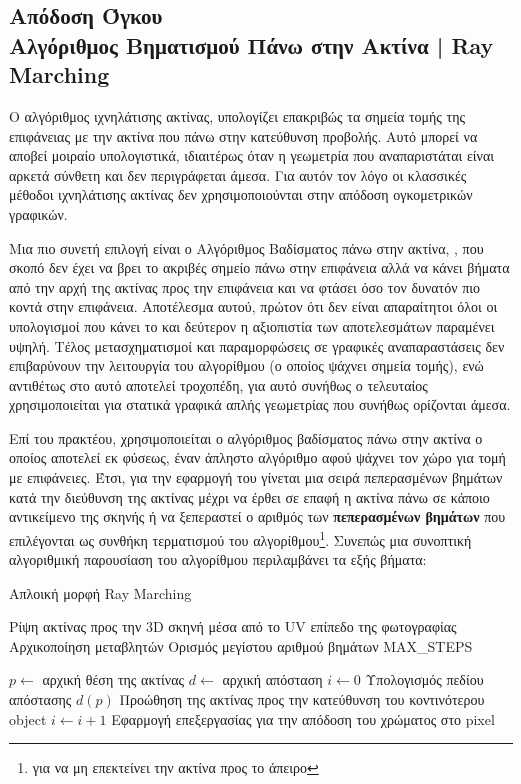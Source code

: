 \subsection{Απόδοση Όγκου \\ \large {Αλγόριθμος Βηματισμού Πάνω στην Ακτίνα | Ray Marching} }
\par
    O αλγόριθμος ιχνηλάτισης ακτίνας, υπολογίζει επακριβώς τα σημεία τομής της επιφάνειας με την ακτίνα που πάνω στην κατεύθυνση προβολής. Αυτό μπορεί να αποβεί μοιραίο υπολογιστικά, ιδιαιτέρως όταν η γεωμετρία που αναπαριστάται είναι αρκετά σύνθετη και δεν περιγράφεται άμεσα. Για αυτόν τον λόγο οι κλασσικές μέθοδοι ιχνηλάτισης ακτίνας δεν χρησιμοποιούνται στην απόδοση ογκομετρικών γραφικών. 
\par
    Μια πιο συνετή επιλογή είναι ο Αλγόριθμος Βαδίσματος πάνω στην ακτίνα, , που σκοπό δεν έχει να βρει το ακριβές σημείο πάνω στην επιφάνεια αλλά να κάνει βήματα από την αρχή της ακτίνας προς την επιφάνεια και να φτάσει όσο τον δυνατόν πιο κοντά στην επιφάνεια. Αποτέλεσμα αυτού, πρώτον ότι δεν είναι απαραίτητοι όλοι οι υπολογισμοί που κάνει το  και δεύτερον η αξιοπιστία των αποτελεσμάτων παραμένει υψηλή. Τέλος μετασχηματισμοί και παραμορφώσεις σε γραφικές αναπαραστάσεις δεν επιβαρύνουν την λειτουργία του αλγορίθμου (ο οποίος ψάχνει σημεία τομής), ενώ αντιθέτως στο  αυτό αποτελεί τροχοπέδη, για αυτό συνήθως ο τελευταίος χρησιμοποιείται για στατικά γραφικά απλής γεωμετρίας που συνήθως ορίζονται άμεσα.
\par
    Επί του πρακτέου, χρησιμοποιείται ο αλγόριθμος βαδίσματος πάνω στην ακτίνα ο οποίος αποτελεί εκ φύσεως, έναν άπληστο αλγόριθμο αφού ψάχνει τον χώρο για τομή με επιφάνειες. Έτσι, για την εφαρμογή του γίνεται μια σειρά πεπερασμένων βημάτων κατά την διεύθυνση της ακτίνας μέχρι να έρθει σε επαφή η ακτίνα πάνω σε κάποιο αντικείμενο της σκηνής ή να ξεπεραστεί ο αριθμός των \textbf{πεπερασμένων βημάτων} που επιλέγονται ως συνθήκη τερματισμού του αλγορίθμου\footnote{για να μη επεκτείνει την ακτίνα προς το άπειρο}. Συνεπώς μια συνοπτική αλγοριθμική παρουσίαση του αλγορίθμου περιλαμβάνει τα εξής βήματα: 
    
    \begin{algorithm}[H]
    \caption{Απλοική μορφή Ray Marching}
    \begin{algorithmic}[1]
    \State Ρίψη ακτίνας προς την 3D σκηνή μέσα από το UV επίπεδο της φωτογραφίας
    \State Αρχικοποίηση μεταβλητών
    \State Ορισμός μεγίστου αριθμού βημάτων MAX\_STEPS
    
        \State $p \gets$ αρχική θέση της ακτίνας
        \State $d \gets$ αρχική απόσταση
        \State $i \gets 0$
            \State Υπολογισμός πεδίου απόστασης $d(p)$
            \State Προώθηση της ακτίνας προς την κατεύθυνση του κοντινότερου object
            \State $i \gets i + 1$
        \EndWhile
        \State Εφαρμογή επεξεργασίας για την απόδοση του χρώματος στο pixel
    \EndFor
    \end{algorithmic}
    \end{algorithm}
    
